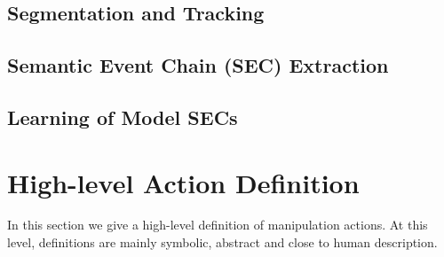 \subsection{Segmentation and Tracking}
\label{sec:segmentationandtracking}
 

\subsection{Semantic Event Chain (SEC) Extraction}
\label{sec:secs}
 

\subsection{Learning of Model SECs}
\label{sec:learning}
 
  
  


\section{High-level Action Definition}
\label{sec:high-level}
In this section we give a high-level definition of manipulation actions.
At this level, definitions are mainly symbolic, abstract and close to human description.

